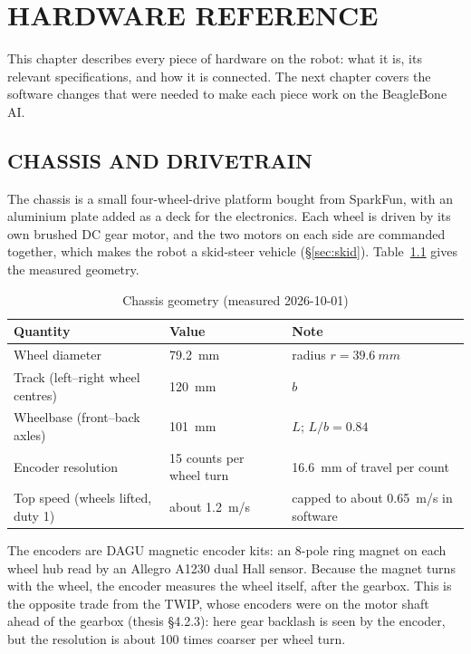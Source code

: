 \chapter{HARDWARE REFERENCE}
\label{ch:platform}

This chapter describes every piece of hardware on the robot: what it is, its
relevant specifications, and how it is connected. The next chapter covers
the software changes that were needed to make each piece work on the
BeagleBone AI.

\section{CHASSIS AND DRIVETRAIN}

The chassis is a small four-wheel-drive platform bought from SparkFun, with an
aluminium plate added as a deck for the electronics. Each wheel is driven by
its own brushed DC gear motor, and the two motors on each side are commanded
together, which makes the robot a skid-steer vehicle
(\S\ref{sec:skid}). Table~\ref{tab:chassis} gives the measured geometry.

\begin{table}[htbp]
\centering
\caption{Chassis geometry (measured 2026-10-01)}
\label{tab:chassis}
\small
\begin{tabular}{lll}
\toprule
Quantity & Value & Note \\
\midrule
Wheel diameter & \SI{79.2}{mm} & radius $r=\SI{39.6}{mm}$ \\
Track (left--right wheel centres) & \SI{120}{mm} & $b$ \\
Wheelbase (front--back axles) & \SI{101}{mm} & $L$; $L/b=0.84$ \\
Encoder resolution & 15 counts per wheel turn & \SI{16.6}{mm} of travel per count \\
Top speed (wheels lifted, duty 1) & about \SI{1.2}{m/s} & capped to about \SI{0.65}{m/s} in software \\
\bottomrule
\end{tabular}
\end{table}

The encoders are DAGU magnetic encoder kits: an 8-pole ring magnet on each
wheel hub read by an Allegro A1230 dual Hall sensor. Because the magnet turns
with the wheel, the encoder measures the wheel itself, after the gearbox. This
is the opposite trade from the TWIP, whose encoders were on the motor shaft
ahead of the gearbox (thesis \S4.2.3): here gear backlash is seen by the
encoder, but the resolution is about 100 times coarser per wheel turn.

